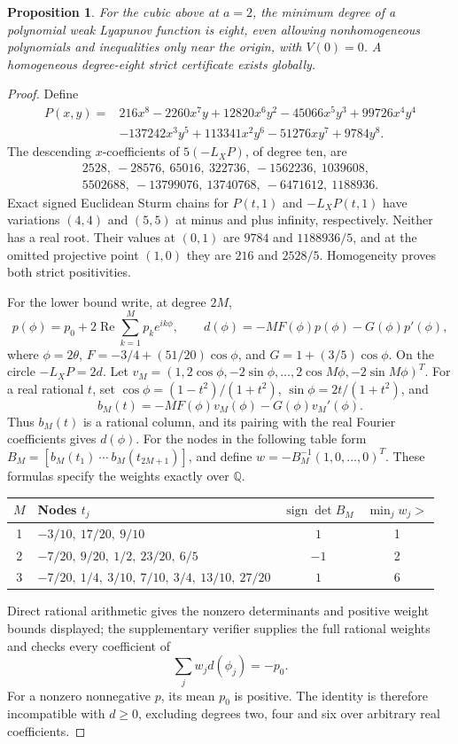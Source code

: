 \documentclass[11pt,a4paper]{article}
\newtheorem{proposition}[theorem]{Proposition}
\theoremstyle{remark}\newtheorem{remark}[theorem]{Remark}
\newcommand{\Rea}{\operatorname{Re}}
\begin{document}
\begin{proposition}\label{prop:min8}
For the cubic above at \(a=2\), the minimum degree of a polynomial
weak Lyapunov function is eight, even allowing nonhomogeneous polynomials
and inequalities only near the origin, with \(V(0)=0\).
A homogeneous degree-eight strict certificate exists globally.
\end{proposition}
\begin{proof}
Define
\begin{align*}
 P(x,y)={}&216x^8-2260x^7y+12820x^6y^2-45066x^5y^3
              +99726x^4y^4\\
          &-137242x^3y^5+113341x^2y^6-51276xy^7+9784y^8.
\end{align*}
The descending \(x\)-coefficients of \(5(-L_XP)\), of degree ten, are
\[
\begin{gathered}
2528,\ -28576,\ 65016,\ 322736,\ -1562236,\ 1039608,\\
5502688,\ -13799076,\ 13740768,\ -6471612,\ 1188936.
\end{gathered}
\]
Exact signed Euclidean Sturm chains for \(P(t,1)\) and
\(-L_XP(t,1)\) have variations \((4,4)\) and \((5,5)\) at
minus and plus infinity, respectively. Neither has a real root.
Their values at \((0,1)\) are \(9784\) and \(1188936/5\),
and at the omitted projective point \((1,0)\) they are
\(216\) and \(2528/5\). Homogeneity proves both strict positivities.

For the lower bound write, at degree \(2M\),
\[
 p(\phi)=p_0+2\Rea\sum_{k=1}^M p_k e^{ik\phi},\qquad
 d(\phi)=-MF(\phi)p(\phi)-G(\phi)p'(\phi),
\]
where \(\phi=2\theta\), \(F=-3/4+(51/20)\cos\phi\), and
\(G=1+(3/5)\cos\phi\). On the circle \(-L_XP=2d\).
Let \(v_M=(1,2\cos\phi,-2\sin\phi,\ldots,
2\cos M\phi,-2\sin M\phi)^T\).
For a real rational \(t\), set
\(\cos\phi=(1-t^2)/(1+t^2)\), \(\sin\phi=2t/(1+t^2)\), and
\[
 b_M(t)=-MF(\phi)v_M(\phi)-G(\phi)v_M'(\phi).
\]
Thus \(b_M(t)\) is a rational column, and its pairing with the
real Fourier coefficients gives \(d(\phi)\).
For the nodes in the following table form
\(B_M=[b_M(t_1)\ \cdots\ b_M(t_{2M+1})]\), and define
\(w=-B_M^{-1}(1,0,\ldots,0)^T\).
These formulas specify the weights exactly over \(\mathbb Q\).
\begin{center}
\begin{tabular}{clcc}
\toprule
\(M\)& Nodes \(t_j\)&\(\operatorname{sign}\det B_M\)&\(\min_j w_j>\)\\
\midrule
1&\(-3/10,\ 17/20,\ 9/10\)&\(1\)&1\\
2&\(-7/20,\ 9/20,\ 1/2,\ 23/20,\ 6/5\)&\(-1\)&2\\
3&\(-7/20,\ 1/4,\ 3/10,\ 7/10,\ 3/4,\ 13/10,\ 27/20\)&\(1\)&6\\
\bottomrule
\end{tabular}
\end{center}
Direct rational arithmetic gives the nonzero determinants and positive
weight bounds displayed; the supplementary verifier supplies the full
rational weights and checks every coefficient of
\[
 \sum_j w_j d(\phi_j)=-p_0.
\]
For a nonzero nonnegative \(p\), its mean \(p_0\) is positive.
The identity is therefore incompatible with \(d\geq0\), excluding
degrees two, four and six over arbitrary real coefficients.


\end{proof}
\end{document}
